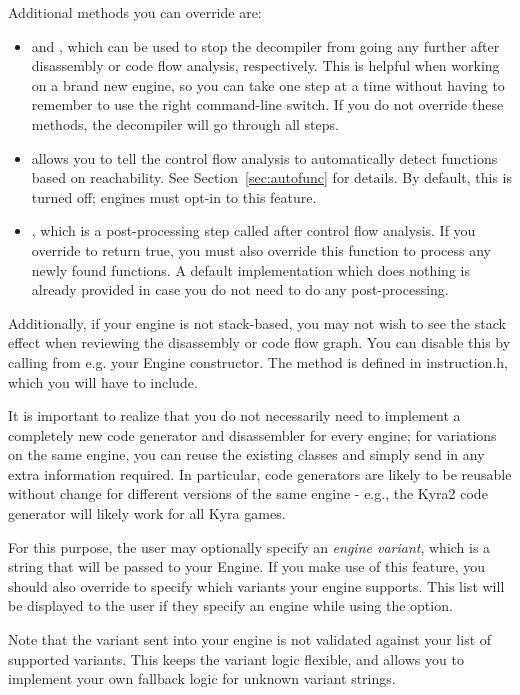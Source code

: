 Additional methods you can override are:
\begin{itemize}
\item {} and , which can be used to stop the decompiler from going any further after disassembly or code flow analysis, respectively. This is helpful when working on a brand new engine, so you can take one step at a time without having to remember to use the right command-line switch. If you do not override these methods, the decompiler will go through all steps.
\item {} allows you to tell the control flow analysis to automatically detect functions based on reachability. See Section~\vref{sec:autofunc} for details. By default, this is turned off; engines must opt-in to this feature.
\item {}, which is a post-processing step called after control flow analysis. If you override  to return true, you must also override this function to process any newly found functions. A default implementation which does nothing is already provided in case you do not need to do any post-processing.
\end{itemize}

Additionally, if your engine is not stack-based, you may not wish to see the stack effect when reviewing the disassembly or code flow graph. You can disable this by calling  from e.g. your Engine constructor. The method is defined in instruction.h, which you will have to include.

It is important to realize that you do not necessarily need to implement a completely new code generator and disassembler for every engine; for variations on the same engine, you can reuse the existing classes and simply send in any extra information required. In particular, code generators are likely to be reusable without change for different versions of the same engine - e.g., the Kyra2 code generator will likely work for all Kyra games.

For this purpose, the user may optionally specify an \emph{engine variant}, which is a string that will be passed to your Engine. If you make use of this feature, you should also override  to specify which variants your engine supports. This list will be displayed to the user if they specify an engine while using the  option.

Note that the variant sent into your engine is not validated against your list of supported variants. This keeps the variant logic flexible, and allows you to implement your own fallback logic for unknown variant strings.

